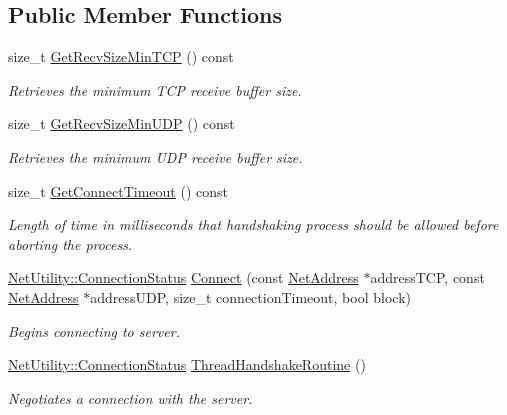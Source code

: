 \subsection*{Public Member Functions}
\begin{DoxyCompactItemize}
\item 
size\_\-t \hyperlink{class_net_instance_client_a1cdd2b3d780fd8ef0ab9cbebedc0b6a5}{GetRecvSizeMinTCP} () const 
\begin{DoxyCompactList}\small\item\em Retrieves the minimum TCP receive buffer size. \item\end{DoxyCompactList}\item 
size\_\-t \hyperlink{class_net_instance_client_a30b1dcba17c247fabb928e5dbca54356}{GetRecvSizeMinUDP} () const 
\begin{DoxyCompactList}\small\item\em Retrieves the minimum UDP receive buffer size. \item\end{DoxyCompactList}\item 
size\_\-t \hyperlink{class_net_instance_client_a647f159bf7881c64ee82dde6498e1a32}{GetConnectTimeout} () const 
\begin{DoxyCompactList}\small\item\em Length of time in milliseconds that handshaking process should be allowed before aborting the process. \item\end{DoxyCompactList}\item 
\hyperlink{class_net_utility_a7eae52138f8bd597ffc67ebf07e86b6d}{NetUtility::ConnectionStatus} \hyperlink{class_net_instance_client_a7f78d5c9c831e9ffce2e4859179e0245}{Connect} (const \hyperlink{class_net_address}{NetAddress} $\ast$addressTCP, const \hyperlink{class_net_address}{NetAddress} $\ast$addressUDP, size\_\-t connectionTimeout, bool block)
\begin{DoxyCompactList}\small\item\em Begins connecting to server. \item\end{DoxyCompactList}\item 
\hyperlink{class_net_utility_a7eae52138f8bd597ffc67ebf07e86b6d}{NetUtility::ConnectionStatus} \hyperlink{class_net_instance_client_a9881a9387f7e46f690e7ae65a9a951c7}{ThreadHandshakeRoutine} ()
\begin{DoxyCompactList}\small\item\em Negotiates a connection with the server. \item\end{DoxyCompactList}\item 

\end{DoxyCompactItemize}
